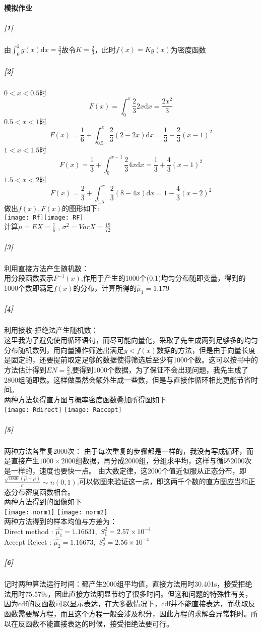 \documentclass[11pt,a4paper]{ctexart}
\newcommand{\dd}[0]{\mathrm{d}}
\begin{document}
\paragraph{模拟作业}
\subparagraph{[1]}
由\(\displaystyle \int_{0}^{2}g(x)\mathrm{d}x = \frac{3}{2}\)故令\(K = \frac{2}{3}\)，此时\(f(x) = Kg(x)\)为密度函数
\subparagraph{[2]}
\(0 < x < 0.5\)时
\[F(x) = \int_{0}^{x}\frac{2}{3}2x\dd x = \frac{2x^2}{3} \]
\(0.5 < x < 1\)时
\[F(x) = \frac{1}{6} + \int_{0.5}^{x}\frac{2}{3}(2 - 2x)\dd x = \frac{1}{3} - \frac{2}{3}(x - 1)^2\]
\(1 < x < 1.5\)时
\[F(x) = \frac{1}{3} + \int_{0}^{x - 1}\frac{2}{3}4x\dd x = \frac{1}{3} + \frac{4}{3}(x - 1)^2\]
\(1.5 < x < 2\)时
\[F(x) = \frac{2}{3} + \int_{1.5}^{x}\frac{2}{3}(8 - 4x)\dd x = 1 - \frac{4}{3}(x - 2)^2  \]
做出\(f(x),F(x)\)的图形如下:\\
\texttt{[image: Rf]}\texttt{[image: RF]}\\
计算\(\displaystyle \mu = EX = \frac{7}{6}\) , \(\displaystyle\sigma^2 = VarX = \frac{19}{72} \)
\subparagraph{[3]}
利用直接方法产生随机数：\\
\indent 用分段函数表示\(F^{-1}(x)\),作用于产生的1000个(0,1)均匀分布随即变量，得到的1000个数即满足\(f(x)\)的分布，计算所得的\(\hat{\mu}_1 = 1.179\)
\subparagraph{[4]}
利用接收-拒绝法产生随机数：\\
\indent 这里我为了避免使用循环语句，而尽可能向量化，采取了先生成两列足够多的均匀分布随机数列，用向量操作筛选出满足\(y < f(x)\)数据的方法，但是由于向量长度是固定的，还要提前取定足够的数据使得筛选后至少有1000个数。这可以按书中的方法估计得到\(EN = \frac{8}{3}\),要得到1000个数据，为了保证不会出现问题，我先生成了2800组随即数。这样做虽然会额外生成一些数，但是与直接作循环相比更能节省时间。\\
两种方法获得直方图与概率密度函数叠加所得图如下\\
{\centering \texttt{[image: Rdirect]} \texttt{[image: Raccept]}}
\subparagraph{[5]}
两种方法各重复2000次：
由于每次重复的步骤都是一样的，我没有写成循环，而是直接产生\(1000\times2000\)组数据，再分成2000组，分组求平均，这样与循环2000次是一样的，速度也要快一点。
由大数定律，这2000个值近似服从正态分布，即\(\displaystyle \frac{\sqrt{1000}(\hat{\mu} - \mu)}{\sigma} \sim n(0,1)\),可以做图来验证这一点，即这两千个数的直方图应当和正态分布密度函数相合。\\
两种方法得到的图像如下\\
{\centering \texttt{[image: norm1]} \texttt{[image: norm2]}}\\
两种方法得到的样本均值与方差为：\\
Direct method : \(\bar{\hat{\mu_1}}=1.16631 ,\;S^2_1 = 2.57\times10^{-4}\)\\
Accept Reject : \(\bar{\hat{\mu_2}}=1.16673 ,\;S^2_2 = 2.56\times10^{-4}\)\\
\subparagraph{[6]}
\indent 记时两种算法运行时间：都产生2000组平均值，直接方法用时30.401s，接受拒绝法用时75.579s，因此直接方法明显节约了很多时间。但这和问题的特殊性有关，因为cdf的反函数可以显示表达，在大多数情况下，cdf并不能直接表达，而获取反函数需要解方程，而且这个方程一般会涉及积分，因此方程的求解会异常耗时。所以在反函数不能直接表达的时候，接受拒绝法要可行。
\end{document}
